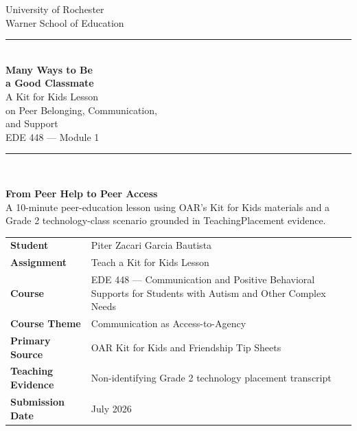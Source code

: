\documentclass[11pt]{article}
\begin{document}
\hypersetup{pageanchor=false}
\begin{titlepage}
\thispagestyle{empty}

\begin{center}
{\large University of Rochester\\}
{\normalsize Warner School of Education\\[0.15in]}

{\color{PrimaryRed}\rule{\textwidth}{1.4pt}}\\[0.12in]
{\Huge\bfseries Many Ways to Be\\[0.07in]
a Good Classmate}\\[0.15in]
{\huge A Kit for Kids Lesson\\[0.07in]
on Peer Belonging, Communication,\\[0.07in]
and Support}\\[0.18in]
{\Large EDE 448 --- Module 1}\\[0.12in]

\vfill

{\color{PrimaryRed}\rule{0.78\textwidth}{0.7pt}}\\[0.22in]

\colorbox{SoftBlue}{%
\parbox{0.88\textwidth}{%
\centering\small\vspace{0.02in}
\textbf{From Peer Help to Peer Access}\\[0.05in]
A 10-minute peer-education lesson using OAR's Kit for Kids materials and a Grade 2 technology-class scenario grounded in TeachingPlacement evidence.
}%
}
\end{center}

\vfill

\begin{center}
\renewcommand{\arraystretch}{1.18}
\setlength{\tabcolsep}{4pt}
\begin{tabular}{>{\bfseries\RaggedLeft}p{1.65in} p{5.0in}}
Student & Piter Zacari Garcia Bautista \\
Assignment & Teach a Kit for Kids Lesson \\
Course & EDE 448 --- Communication and Positive Behavioral Supports for Students with Autism and Other Complex Needs \\
Course Theme & Communication as Access-to-Agency \\
Primary Source & OAR Kit for Kids and Friendship Tip Sheets \\
Teaching Evidence & Non-identifying Grade 2 technology placement transcript \\
Submission Date & July 2026 \\
\end{tabular}
\end{center}


\end{titlepage}
\end{document}
